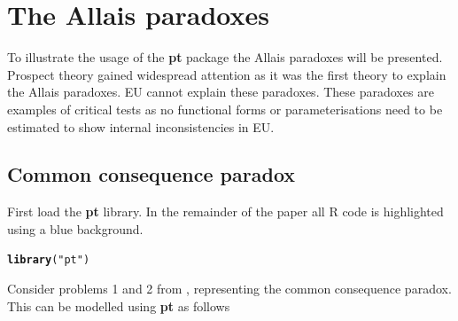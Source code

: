 \documentclass{article}\usepackage[]{graphicx}\usepackage[]{color}
\makeatletter
\newcommand{\hlstr}[1]{\textcolor[rgb]{0.192,0.494,0.8}{#1}}%
\newcommand{\hlstd}[1]{\textcolor[rgb]{0.345,0.345,0.345}{#1}}%
\newcommand{\hlkwd}[1]{\textcolor[rgb]{0.737,0.353,0.396}{\textbf{#1}}}%
\newenvironment{kframe}{%
 \def\at@end@of@kframe{}%
 \ifinner\ifhmode%
  \def\at@end@of@kframe{\end{minipage}}%
  \begin{minipage}{\columnwidth}%
 \fi\fi%
 \def\FrameCommand##1{\hskip\@totalleftmargin \hskip-\fboxsep
 \colorbox{shadecolor}{##1}\hskip-\fboxsep
     \hskip-\linewidth \hskip-\@totalleftmargin \hskip\columnwidth}%
 \MakeFramed {\advance\hsize-\width
   \@totalleftmargin\z@ \linewidth\hsize
   \@setminipage}}%
 {\par\unskip\endMakeFramed%
 \at@end@of@kframe}
\newenvironment{knitrout}{}{} %
\makeatother
\begin{document}
\section{The Allais paradoxes}

To illustrate the usage of the {\bf pt} package the Allais paradoxes will be presented. 
Prospect theory gained widespread attention as it was the first theory to explain the Allais paradoxes. EU cannot explain these paradoxes. These paradoxes are examples of critical tests \citep*{Birnbaum_2011} as no functional forms or parameterisations need to be estimated to show internal inconsistencies in EU.

\subsection{Common consequence paradox}

First load the {\bf pt} library. In the remainder of the paper all R code is highlighted using a blue background.

\begin{knitrout}
\color{fgcolor}\begin{kframe}
\begin{alltt}
\hlkwd{library}\hlstd{(}\hlstr{"pt"}\hlstd{)}
\end{alltt}
\end{kframe}
\end{knitrout}


Consider problems 1 and 2 from \citet[][p. 265-266]{Kahneman_Tversky_1979}, representing the common consequence paradox. This can be modelled using {\bf pt} as follows
\end{document}
